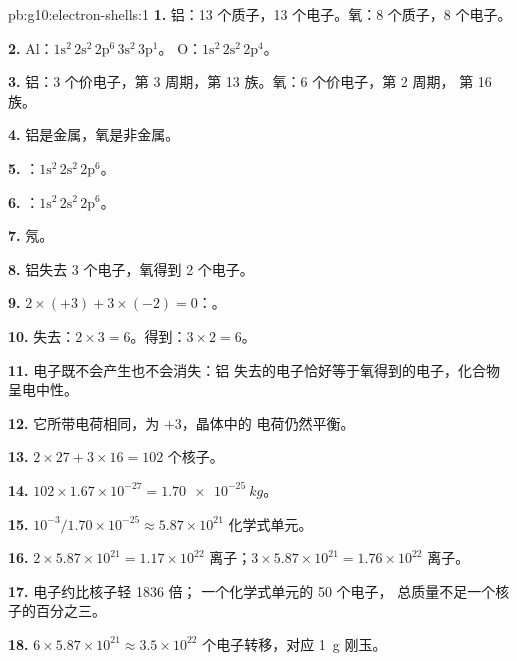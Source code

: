 \begin{solution}{pb:g10:electron-shells:1}
\textbf{1.} 铝：13 个质子，13 个电子。氧：8 个质子，8
个电子。

\textbf{2.} Al：$1\mathrm{s}^2\,2\mathrm{s}^2\,2\mathrm{p}^6\,3\mathrm{s}^2\,3\mathrm{p}^1$。
O：$1\mathrm{s}^2\,2\mathrm{s}^2\,2\mathrm{p}^4$。

\textbf{3.} 铝：3 个价电子，第 3 周期，第 13 族。氧：6 个价电子，第 2 周期，
第 16 族。

\textbf{4.} 铝是金属，氧是非金属。

\textbf{5.} ：$1\mathrm{s}^2\,2\mathrm{s}^2\,2\mathrm{p}^6$。

\textbf{6.} ：$1\mathrm{s}^2\,2\mathrm{s}^2\,2\mathrm{p}^6$。

\textbf{7.} 氖。

\textbf{8.} 铝失去 3 个电子，氧得到 2 个电子。

\textbf{9.} $2 \times (+3) + 3 \times (-2) = 0$：。

\textbf{10.} 失去：$2 \times 3 = 6$。得到：$3 \times 2 = 6$。

\textbf{11.} 电子既不会产生也不会消失：铝
失去的电子恰好等于氧得到的电子，化合物
呈电中性。

\textbf{12.} 它所带电荷相同，为 $+3$，晶体中的
电荷仍然平衡。

\textbf{13.} $2 \times 27 + 3 \times 16 = 102$ 个核子。

\textbf{14.} $102 \times 1.67 \times 10^{-27} = \qty{1.70e-25}{kg}$。

\textbf{15.} $10^{-3} / 1.70 \times 10^{-25} \approx 5.87 \times 10^{21}$
化学式单元。

\textbf{16.} $2 \times 5.87 \times 10^{21} = 1.17 \times 10^{22}$
 离子；$3 \times 5.87 \times 10^{21} = 1.76 \times 10^{22}$
 离子。

\textbf{17.} 电子约比核子轻 1836 倍；
一个化学式单元的 50 个电子，
总质量不足一个核子的百分之三。

\textbf{18.} $6 \times 5.87 \times 10^{21} \approx 3.5 \times 10^{22}$
个电子转移，对应 \qty{1}{g} 刚玉。
\end{solution}
